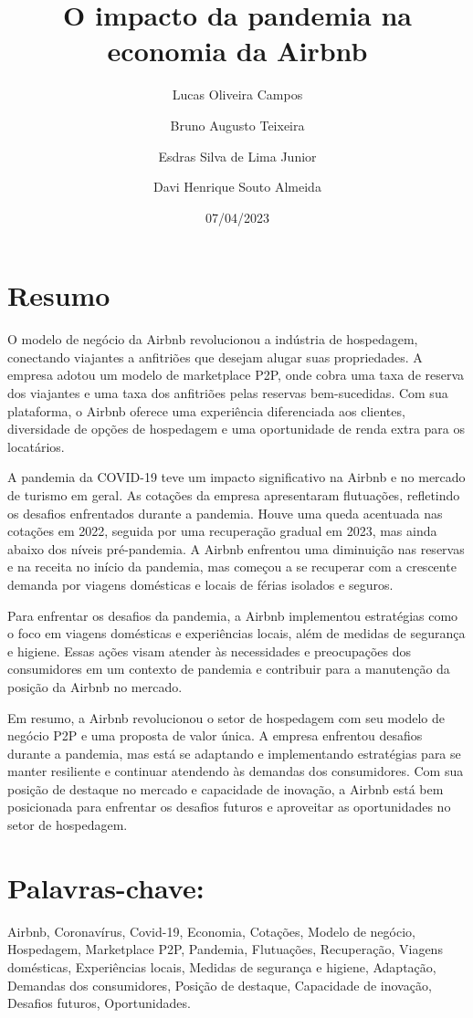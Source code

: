 \documentclass{article}
\title{O impacto da pandemia na economia da Airbnb}
\author{Lucas Oliveira Campos\and Bruno Augusto Teixeira\and Esdras Silva de Lima Junior\and Davi Henrique Souto Almeida
}
\date{07/04/2023}
\begin{document}
\maketitle

\onehalfspacing
\section*{Resumo}
O modelo de negócio da Airbnb revolucionou a indústria de hospedagem, conectando viajantes a anfitriões que desejam alugar suas propriedades. A empresa adotou um modelo de marketplace P2P, onde cobra uma taxa de reserva dos viajantes e uma taxa dos anfitriões pelas reservas bem-sucedidas. Com sua plataforma, o Airbnb oferece uma experiência diferenciada aos clientes, diversidade de opções de hospedagem e uma oportunidade de renda extra para os locatários.

A pandemia da COVID-19 teve um impacto significativo na Airbnb e no mercado de turismo em geral. As cotações da empresa apresentaram flutuações, refletindo os desafios enfrentados durante a pandemia. Houve uma queda acentuada nas cotações em 2022, seguida por uma recuperação gradual em 2023, mas ainda abaixo dos níveis pré-pandemia. A Airbnb enfrentou uma diminuição nas reservas e na receita no início da pandemia, mas começou a se recuperar com a crescente demanda por viagens domésticas e locais de férias isolados e seguros.

Para enfrentar os desafios da pandemia, a Airbnb implementou estratégias como o foco em viagens domésticas e experiências locais, além de medidas de segurança e higiene. Essas ações visam atender às necessidades e preocupações dos consumidores em um contexto de pandemia e contribuir para a manutenção da posição da Airbnb no mercado.

Em resumo, a Airbnb revolucionou o setor de hospedagem com seu modelo de negócio P2P e uma proposta de valor única. A empresa enfrentou desafios durante a pandemia, mas está se adaptando e implementando estratégias para se manter resiliente e continuar atendendo às demandas dos consumidores. Com sua posição de destaque no mercado e capacidade de inovação, a Airbnb está bem posicionada para enfrentar os desafios futuros e aproveitar as oportunidades no setor de hospedagem.
\vspace{1cm}
\onehalfspacing 

\section*{Palavras-chave:}
Airbnb, Coronavírus, Covid-19, Economia, Cotações, Modelo de negócio, Hospedagem, Marketplace P2P, Pandemia, Flutuações, Recuperação, Viagens domésticas, Experiências locais, Medidas de segurança e higiene, Adaptação, Demandas dos consumidores, Posição de destaque, Capacidade de inovação, Desafios futuros, Oportunidades.
\vspace{1cm}
\onehalfspacing
\end{document}
